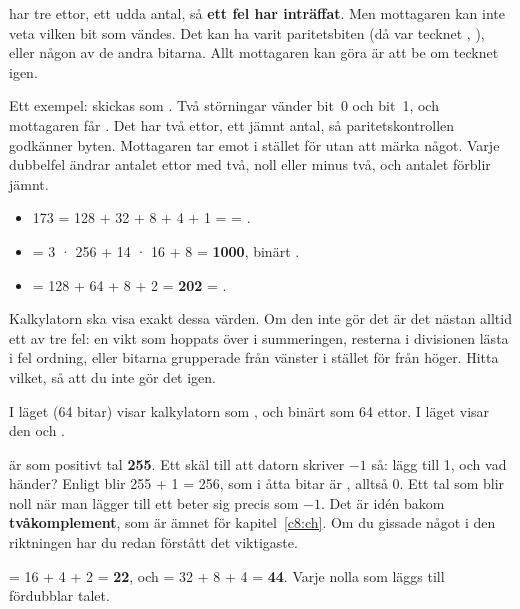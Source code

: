 har tre ettor, ett udda antal, så \textbf{ett fel har inträffat}. Men
mottagaren kan inte veta vilken bit som vändes. Det kan ha varit paritetsbiten (då var tecknet
, ), eller någon av de andra bitarna. Allt mottagaren kan göra är att be om
tecknet igen.

Ett exempel:  skickas som . Två störningar vänder bit~0 och bit~1, och
mottagaren får . Det har två ettor, ett jämnt antal, så paritetskontrollen godkänner
byten. Mottagaren tar emot  i stället för  utan att märka något. Varje dubbelfel
ändrar antalet ettor med två, noll eller minus två, och antalet förblir jämnt.

\leavevmode
\begin{itemize}
  \item 173 = 128 + 32 + 8 + 4 + 1 = \textbf{} = \textbf{}.
  \item {} = 3 · 256 + 14 · 16 + 8 = \textbf{1000}, binärt \textbf{}.
  \item {} = 128 + 64 + 8 + 2 = \textbf{202} = \textbf{}.
\end{itemize}

Kalkylatorn ska visa exakt dessa värden. Om den inte gör det är det nästan alltid ett av tre
fel: en vikt som hoppats över i summeringen, resterna i divisionen lästa i fel ordning, eller
bitarna grupperade från vänster i stället för från höger. Hitta vilket, så att du inte gör det
igen.

I läget  (64 bitar) visar kalkylatorn  som ,
och binärt som 64 ettor. I läget  visar den  och .

 är som positivt tal \textbf{255}. Ett skäl till att datorn skriver $-1$ så:
lägg till 1, och vad händer? Enligt  blir 255 + 1 = 256, som i åtta bitar är
, alltså 0. Ett tal som blir noll när man lägger till ett beter sig precis som $-1$.
Det är idén bakom \textbf{tvåkomplement}, som är ämnet för kapitel~\ref{c8:ch}. Om du gissade något
i den riktningen har du redan förstått det viktigaste.

 = 16 + 4 + 2 = \textbf{22}, och  = 32 + 8 + 4 = \textbf{44}.
Varje nolla som läggs till fördubblar talet.

